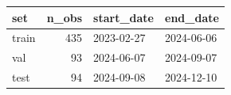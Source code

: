 \begin{tabular}{lrll}
\toprule
set & n_obs & start_date & end_date \\
\midrule
train & 435 & 2023-02-27 & 2024-06-06 \\
val & 93 & 2024-06-07 & 2024-09-07 \\
test & 94 & 2024-09-08 & 2024-12-10 \\
\bottomrule
\end{tabular}
